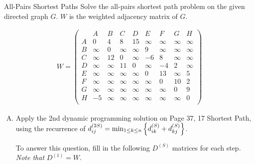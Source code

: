 \documentclass{article}
\numberwithin{table}{section}
\numberwithin{figure}{section}
\begin{document}
\newpage
\begin{section}{All-Pairs Shortest Paths}
Solve the all-pairs shortest path problem on the given directed graph $G$. $W$ is the weighted adjacency matrix of $G$.

\begin{align*}
    W = \begin{pmatrix}
        & A & B & C & D & E & F & G & H \\
        A & 0 & 4 & 8 & 15 & \infty & \infty & \infty & \infty \\
        B & \infty & 0 & \infty & \infty & 9 & \infty & \infty & \infty \\
        C & \infty & 12 & 0 & \infty & -6 & 8 & \infty & \infty \\
        D & \infty & \infty & 11 & 0 & \infty & -4 & 2 & \infty \\
        E & \infty & \infty & \infty & \infty & 0 & 13 & \infty & 5 \\
        F & \infty & \infty & \infty & \infty & \infty & 0 & 10 & 2 \\
        G & \infty & \infty & \infty & \infty & \infty & \infty & 0 & 9 \\
        H & -5 & \infty & \infty & \infty & \infty & \infty & \infty & 0 \\
    \end{pmatrix}
\end{align*}
\begin{enumerate}[(A)]
    \item Apply the 2nd dynamic programming solution on Page 37, 17 Shortest Path,
    using the recurrence of $d_{ij}^{(2S)} = \min_{1 \leq k \leq n} \left\{d_{ik}^{(S)} + d_{kj}^{(S)}\right\}$.

    To answer this question, fill in the following $D^{(S)}$ matrices for each
    step. \textit{Note that} $D^{(1)} = W$.


\end{enumerate}
\end{section}
\end{document}
